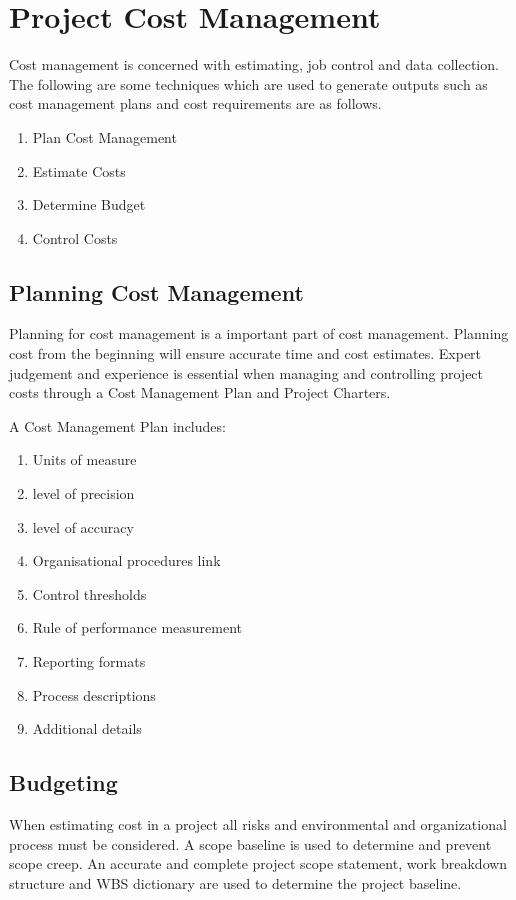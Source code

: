 \chapter{Project Cost Management}

Cost management is concerned with estimating, job control and data collection. The following are some techniques which are used to generate outputs such as cost management plans and cost requirements are as follows. 
\begin{enumerate}
\item Plan Cost Management
\item Estimate Costs
\item Determine Budget
\item Control Costs
\end{enumerate}

\section{Planning Cost Management}

Planning for cost management is a important part of cost management. Planning cost from the beginning will ensure accurate time and cost estimates. Expert judgement and experience is essential when managing and controlling project costs through a Cost Management Plan and Project Charters. 

A Cost Management Plan includes:
\begin{enumerate}
\item Units of measure
\item level of precision 
\item level of accuracy
\item Organisational procedures link
\item Control thresholds
\item Rule of performance measurement
\item Reporting formats
\item Process descriptions
\item Additional details
\end{enumerate}

\section{Budgeting}

When estimating cost in a project all risks and environmental and organizational process must be considered. A scope baseline is used to determine and prevent scope creep. An accurate and complete project scope statement, work breakdown structure and WBS dictionary are used to determine the project baseline.

